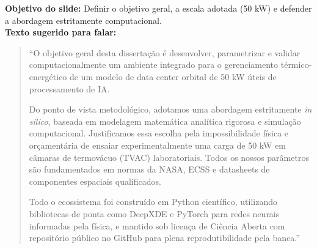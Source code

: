 \documentclass[11pt,a4paper]{article}
\begin{document}
\begin{tcolorbox}[colback=speechbg, colframe=bordergreen, title=\color{ifesdark}\textbf{SLIDE 3: OBJETIVOS E METODOLOGIA COMPUTACIONAL \hfill TEMPO: 1:45 -- 3:00 (Duração: 75 segundos)}]
\small
\textbf{Objetivo do slide:} Definir o objetivo geral, a escala adotada (50 kW) e defender a abordagem estritamente computacional.\\
\textbf{Texto sugerido para falar:}
\begin{quote}
``O objetivo geral desta dissertação é desenvolver, parametrizar e validar computacionalmente um ambiente integrado para o gerenciamento térmico-energético de um modelo de data center orbital de 50 kW úteis de processamento de IA.

Do ponto de vista metodológico, adotamos uma abordagem estritamente \textit{in silico}, baseada em modelagem matemática analítica rigorosa e simulação computacional. Justificamos essa escolha pela impossibilidade física e orçamentária de ensaiar experimentalmente uma carga de 50 kW em câmaras de termovácuo (TVAC) laboratoriais. Todos os nossos parâmetros são fundamentados em normas da NASA, ECSS e datasheets de componentes espaciais qualificados.

Todo o ecossistema foi construído em Python científico, utilizando bibliotecas de ponta como DeepXDE e PyTorch para redes neurais informadas pela física, e mantido sob licença de Ciência Aberta com repositório público no GitHub para plena reprodutibilidade pela banca.''
\end{quote}
\end{tcolorbox}
\end{document}
